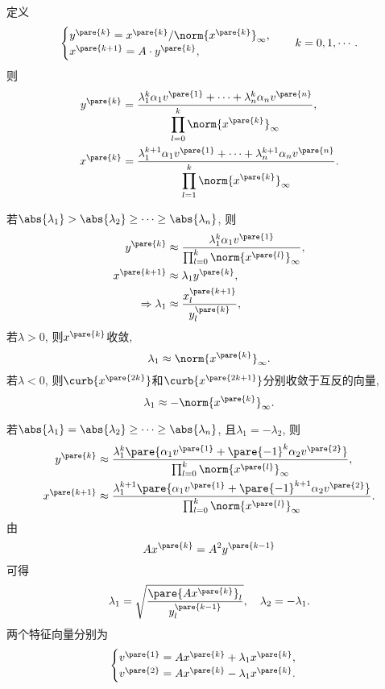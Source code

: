 \documentclass[hidelinks]{ctexart}
\begin{document}
定义
\[ \begin{cases}
    y^{\pare{k}} = x^{\pare{k}}/\norm{x^{\pare{k}}}_\infty,\\
    x^{\pare{k+1}} = A\cdot y^{\pare{k}},
\end{cases}\quad k = 0,1,\cdots. \]
则
\begin{align*}
    y^{\pare{k}} &= \frac{\lambda_1^k\alpha_1 v^{\pare{1}} + \cdots + \lambda_n^k \alpha_n v^{\pare{n}}}{\displaystyle \prod_{l=0}^k \norm{x^{\pare{k}}}_\infty}, \\
    x^{\pare{k}} &= \frac{\lambda_1^{k+1}\alpha_1 v^{\pare{1}} + \cdots + \lambda_n^{k+1} \alpha_n v^{\pare{n}}}{\displaystyle \prod_{l=1}^k \norm{x^{\pare{k}}}_\infty}.
\end{align*}
\begin{cenum}
    \item 若$\abs{\lambda_1} > \abs{\lambda_2} \ge \cdots \ge \abs{\lambda_n}$, 则
    \begin{align*}
        y^{\pare{k}} &\approx \frac{\lambda_1^k \alpha_1 v^{\pare{1}}}{\prod_{l=0}^k \norm{x^{\pare{l}}}_\infty}, \\
        x^{\pare{k+1}} &\approx \lambda_1 y^{\pare{k}}, \\
        \Rightarrow \lambda_1 &\approx \frac{x^{\pare{k+1}}_l}{y^{\pare{k}}_l},
    \end{align*}
    若$\lambda > 0$, 则$x^{\pare{k}}$收敛,
    \[ \lambda_1 \approx \norm{x^{\pare{k}}}_\infty. \]
    若$\lambda < 0$, 则$\curb{x^{\pare{2k}}}$和$\curb{x^{\pare{2k+1}}}$分别收敛于互反的向量,
    \[ \lambda_1 \approx -\norm{x^{\pare{k}}}_\infty. \]
    \item 若$\abs{\lambda_1} = \abs{\lambda_2} \ge \cdots \ge \abs{\lambda_n}$, 且$\lambda_1 = -\lambda_2$, 则
    \begin{align*}
        y^{\pare{k}} &\approx \frac{\lambda_1^k\pare{\alpha_1 v^{\pare{1}} + \pare{-1}^k \alpha_2 v^{\pare{2}}}}{\prod_{l=0}^k \norm{x^{\pare{l}}}_\infty}, \\
        x^{\pare{k+1}} &\approx \frac{\lambda_1^{k+1}\pare{\alpha_1 v^{\pare{1}} + \pare{-1}^{k+1} \alpha_2 v^{\pare{2}}}}{\prod_{l=0}^k \norm{x^{\pare{l}}}_\infty}.
    \end{align*}
    由
    \[ Ax^{\pare{k}} = A^2 y^{\pare{k-1}} \]
    可得
    \[ \lambda_1 = \sqrt{\frac{\pare{Ax^{\pare{k}}}_l}{y^{\pare{k-1}}_l}},\quad \lambda_2 = -\lambda_1. \]
    两个特征向量分别为
    \[ \begin{cases}
        v^{\pare{1}} = Ax^{\pare{k}} + \lambda_1 x^{\pare{k}}, \\
        v^{\pare{2}} = Ax^{\pare{k}} - \lambda_1 x^{\pare{k}}.
    \end{cases} \]
\end{cenum}
\end{document}
